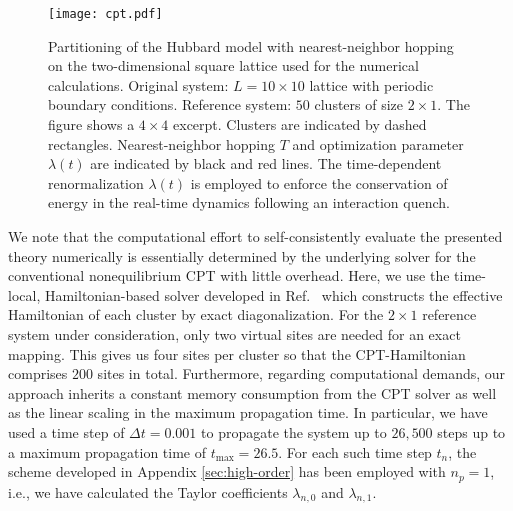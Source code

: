 \documentclass[twocolumn,prb,showpacs,aps,superscriptaddress]{revtex4}
\begin{document}
\begin{figure}
\texttt{[image: cpt.pdf]}
\caption{
  Partitioning of the Hubbard model with nearest-neighbor hopping on the
  two-dimensional square lattice used for the numerical calculations. Original
  system: $L=10 \times 10$ lattice with periodic boundary conditions.
  Reference system: $50$ clusters of size $2 \times 1$.  The figure shows a $4
  \times 4$ excerpt.  Clusters are indicated by dashed rectangles.
  Nearest-neighbor hopping $T$ and optimization parameter $\lambda(t)$ are
  indicated by black and red lines.  The time-dependent renormalization
  $\lambda(t)$ is employed to enforce the conservation of energy in the
  real-time dynamics following an interaction quench.
}
\label{fig:setup}
\end{figure}

We note that the computational effort to self-consistently evaluate the presented theory numerically is essentially determined by the underlying solver for the conventional nonequilibrium CPT with little overhead. 
Here, we use the time-local, Hamiltonian-based solver developed in Ref.\  which constructs
the effective Hamiltonian of each cluster by exact diagonalization. 
For the $2 \times 1$ reference system under consideration, only two virtual sites are needed for an exact mapping. This gives us four sites per cluster so that the CPT-Hamiltonian comprises $200$ sites in total. 
Furthermore, regarding computational demands, our approach inherits a constant memory consumption from the CPT solver as well as the linear scaling in the maximum propagation time.
In particular, we have used a time step of $\Delta t = 0.001$ to propagate the system up to $26,500$ steps up to a maximum propagation time of $t_\text{max}=26.5$. For each such time step $t_n$, the scheme developed in Appendix \ref{sec:high-order} has been employed with $n_p=1$, i.e., we have calculated the Taylor coefficients $\lambda_{n,0}$ and $\lambda_{n,1}$.
\end{document}
